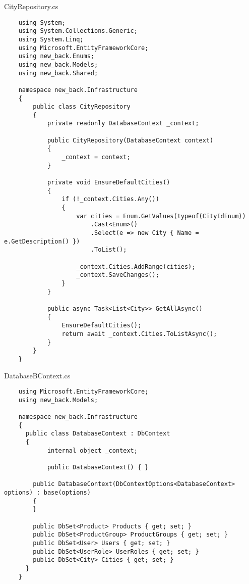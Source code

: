 CityRepository.cs
\lstset{style=sharpc}
\begin{lstlisting}
    using System;
    using System.Collections.Generic;
    using System.Linq;
    using Microsoft.EntityFrameworkCore;
    using new_back.Enums;
    using new_back.Models;
    using new_back.Shared;
    
    namespace new_back.Infrastructure
    {
        public class CityRepository
        {
            private readonly DatabaseContext _context;
    
            public CityRepository(DatabaseContext context)
            {
                _context = context;
            }
    
            private void EnsureDefaultCities()
            {
                if (!_context.Cities.Any())
                {
                    var cities = Enum.GetValues(typeof(CityIdEnum))
                        .Cast<Enum>()
                        .Select(e => new City { Name = e.GetDescription() })
                        .ToList();
    
                    _context.Cities.AddRange(cities);
                    _context.SaveChanges();
                }
            }
    
            public async Task<List<City>> GetAllAsync()
            {
                EnsureDefaultCities();
                return await _context.Cities.ToListAsync();
            }
        }
    }    
\end{lstlisting}

DatabaseBContext.cs
\lstset{style=sharpc}
\begin{lstlisting}
    using Microsoft.EntityFrameworkCore;
    using new_back.Models;
    
    namespace new_back.Infrastructure
    {  
      public class DatabaseContext : DbContext
      {
            internal object _context;
    
            public DatabaseContext() { }
    
        public DatabaseContext(DbContextOptions<DatabaseContext> options) : base(options)
        {
        }
    
        public DbSet<Product> Products { get; set; }
        public DbSet<ProductGroup> ProductGroups { get; set; }
        public DbSet<User> Users { get; set; }
        public DbSet<UserRole> UserRoles { get; set; }
        public DbSet<City> Cities { get; set; }
      }
    }
\end{lstlisting}

